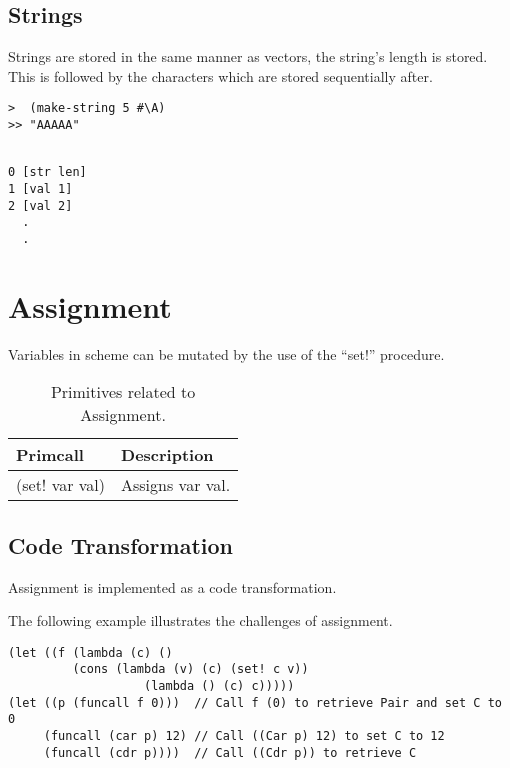 \documentclass{article}
\begin{document}
\subsection{Strings}

Strings are stored in the same manner as vectors, the string's length is stored. This is followed by the characters which are stored sequentially after. 

\begin{verbatim}
>  (make-string 5 #\A)
>> "AAAAA"

\end{verbatim}

\begin{verbatim}

0 [str len]
1 [val 1]
2 [val 2]
  .
  .

\end{verbatim}





\section{Assignment}

Variables in scheme can be mutated by the use of the ``set!'' procedure.  

\begin{table}[ht]
  \centering
\begin{tabular}{ l l }
  \toprule
  Primcall & Description \\ \hline
  \midrule
  (set! var val) & Assigns var val.  \\
  \bottomrule
\end{tabular}
\caption{Primitives related to Assignment.} \label{tab:assignment}
\end{table}

\subsection{Code Transformation}

Assignment is implemented as a code transformation.

The following example illustrates the challenges of assignment.

\begin{verbatim}
(let ((f (lambda (c) ()
     	 (cons (lambda (v) (c) (set! c v))
	       	       (lambda () (c) c)))))
(let ((p (funcall f 0)))  // Call f (0) to retrieve Pair and set C to 0
     (funcall (car p) 12) // Call ((Car p) 12) to set C to 12
     (funcall (cdr p))))  // Call ((Cdr p)) to retrieve C

\end{verbatim}
\end{document}
